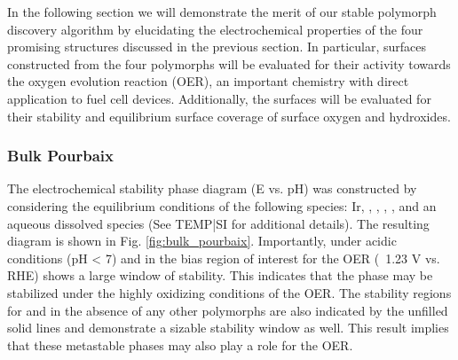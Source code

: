 

In the following section we will demonstrate the merit of our stable polymorph discovery algorithm by elucidating the electrochemical properties of the four promising structures discussed in the previous section.
In particular, surfaces constructed from the four polymorphs will be evaluated for their activity towards the oxygen evolution reaction (OER), an important chemistry with direct application to fuel cell devices.
Additionally, the surfaces will be evaluated for their stability and equilibrium surface coverage of surface oxygen and hydroxides.

\subsubsection{Bulk Pourbaix}

The electrochemical stability phase diagram (E vs. pH) was constructed by considering the equilibrium conditions of the following species: Ir, \rIrOtwo, \aIrOthree, \rIrOthree, \bIrOthree, and an aqueous dissolved  species (See TEMP|SI for additional details).
The resulting diagram is shown in Fig. \ref{fig:bulk_pourbaix}.
Importantly, under acidic conditions (pH < 7) and in the bias region of interest for the OER (~1.23 V vs. RHE) \aIrOthree shows a large window of stability.
This indicates that the \aIrOthree phase may be stabilized under the highly oxidizing conditions of the OER.
The stability regions for \rIrOthree and \bIrOthree in the absence of any other  polymorphs are also indicated by the unfilled solid lines and demonstrate a sizable stability window as well.
This result implies that these metastable phases may also play a role for the OER.

